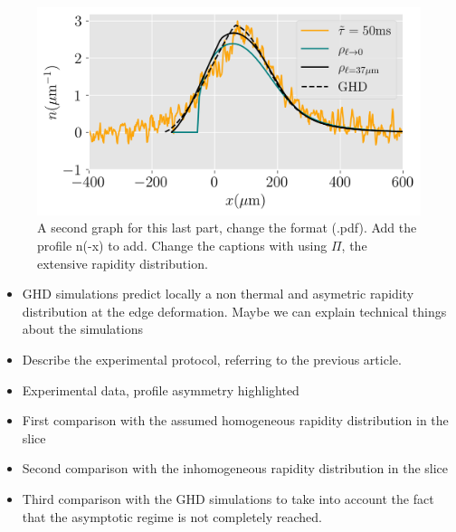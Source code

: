 \documentclass[submission, Phys]{SciPost}
\begin{document}
 \begin{figure}[!htb]
     \centering
     \includegraphics[width=0.8\linewidth]{Figures/asymetrie_GHD_all.png}
     \caption{A second graph for this last part, change the format (.pdf). Add the profile n(-x) to add. Change the captions with using $\Pi$, the extensive rapidity distribution.}
     \label{fig:local}
 \end{figure}

 \begin{itemize}
     \item GHD simulations predict locally a non thermal and asymetric rapidity distribution at the edge deformation. Maybe we can explain technical things about the simulations
     \item Describe the experimental protocol, referring to the previous article.  
     \item Experimental data, profile asymmetry highlighted
     \item First comparison with the assumed homogeneous rapidity distribution in the slice
     \item Second comparison with the inhomogeneous rapidity distribution in the slice
     \item Third comparison with the GHD simulations to take into account the fact that the asymptotic regime is not completely reached.
 \end{itemize}
 
\end{document}
